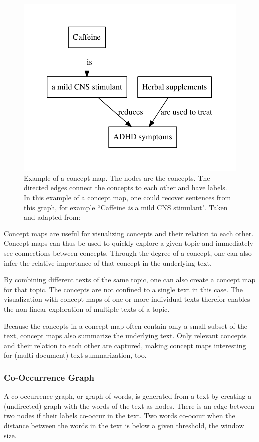 \begin{figure}[ht]
\centering
\includegraphics[width=0.5\linewidth]{assets/figures/concept_map.pdf}
\caption{Example of a concept map. The nodes are the concepts. The directed edges connect the concepts to each other and have labels. In this example of a concept map, one could recover sentences from this graph, for example ``Caffeine \textit{is} a mild CNS stimulant". Taken and adapted from: \cite{Falke2017}}
\label{fig:concept_map}
\end{figure}

Concept maps are useful for visualizing concepts and their relation to each other.
Concept maps can thus be used to quickly explore a given topic and immediately see connections between concepts.
Through the degree of a concept, one can also infer the relative importance of that concept in the underlying text.

By combining different texts of the same topic, one can also create a concept map for that topic.
The concepts are not confined to a single text in this case.
The visualization with concept maps of one or more individual texts therefor enables the non-linear exploration of multiple texts of a topic.

Because the concepts in a concept map often contain only a small subset of the text, concept maps also summarize the underlying text.
Only relevant concepts and their relation to each other are captured, making concept maps interesting for (multi-document) text summarization, too.




\subsubsection{Co-Occurrence Graph}
A co-occurrence graph, or graph-of-words, is generated from a text by creating a (undirected) graph with the words of the text as nodes.
There is an edge between two nodes if their labels co-occur in the text.
Two words co-occur when the distance between the words in the text is below a given threshold, the window size.

